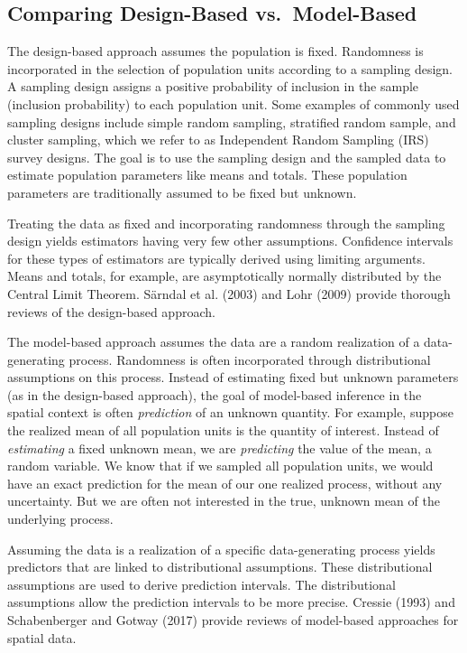 \documentclass[]{elsarticle} %
\begin{document}
\hypertarget{comparing-design-based-vs.-model-based}{%
\subsection{Comparing Design-Based
vs.~Model-Based}\label{comparing-design-based-vs.-model-based}}

The design-based approach assumes the population is fixed. Randomness is
incorporated in the selection of population units according to a
sampling design. A sampling design assigns a positive probability of
inclusion in the sample (inclusion probability) to each population unit.
Some examples of commonly used sampling designs include simple random
sampling, stratified random sample, and cluster sampling, which we refer
to as Independent Random Sampling (IRS) survey designs. The goal is to
use the sampling design and the sampled data to estimate population
parameters like means and totals. These population parameters are
traditionally assumed to be fixed but unknown.

Treating the data as fixed and incorporating randomness through the
sampling design yields estimators having very few other assumptions.
Confidence intervals for these types of estimators are typically derived
using limiting arguments. Means and totals, for example, are
asymptotically normally distributed by the Central Limit Theorem.
Särndal et al. (2003) and Lohr (2009) provide thorough reviews of the
design-based approach.

The model-based approach assumes the data are a random realization of a
data-generating process. Randomness is often incorporated through
distributional assumptions on this process. Instead of estimating fixed
but unknown parameters (as in the design-based approach), the goal of
model-based inference in the spatial context is often \emph{prediction}
of an unknown quantity. For example, suppose the realized mean of all
population units is the quantity of interest. Instead of
\emph{estimating} a fixed unknown mean, we are \emph{predicting} the
value of the mean, a random variable. We know that if we sampled all
population units, we would have an exact prediction for the mean of our
one realized process, without any uncertainty. But we are often not
interested in the true, unknown mean of the underlying process.

Assuming the data is a realization of a specific data-generating process
yields predictors that are linked to distributional assumptions. These
distributional assumptions are used to derive prediction intervals. The
distributional assumptions allow the prediction intervals to be more
precise. Cressie (1993) and Schabenberger and Gotway (2017) provide
reviews of model-based approaches for spatial data.
\end{document}
